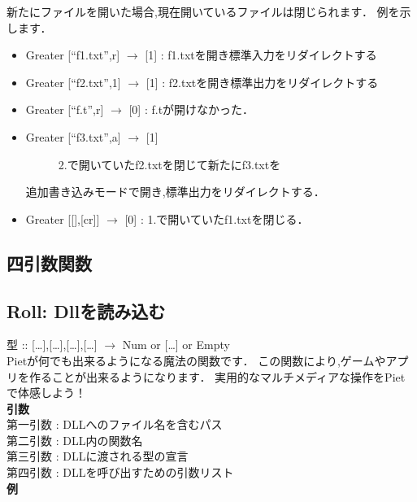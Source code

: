 新たにファイルを開いた場合,現在開いているファイルは閉じられます．
例を示します．

\begin{itemize}
\item
  Greater {[}``f1.txt'',r{]} $\to$ {[}1{]} :
  f1.txtを開き標準入力をリダイレクトする
\item
  Greater {[}``f2.txt'',1{]} $\to$ {[}1{]} :
  f2.txtを開き標準出力をリダイレクトする
\item
  Greater {[}``f.t'',r{]} $\to$ {[}0{]} : f.tが開けなかった．
\item
  \begin{description}
  \item[Greater {[}``f3.txt'',a{]} $\to$ {[}1{]}]
  2.で開いていたf2.txtを閉じて新たにf3.txtを
  \end{description}

  追加書き込みモードで開き,標準出力をリダイレクトする．
\item
  Greater {[}{[}{]},{[}cr{]}{]} $\to$ {[}0{]} :
  1.で開いていたf1.txtを閉じる．
\end{itemize}

\subsection{四引数関数}

\subsection{Roll: Dllを読み込む}

型 :: {[}\ldots{}{]},{[}\ldots{}{]},{[}\ldots{}{]},{[}\ldots{}{]}
$\to$ Num or {[}\ldots{}{]} or
Empty\\Pietが何でも出来るようになる魔法の関数です．
この関数により,ゲームやアプリを作ることが出来るようになります．
実用的なマルチメディアな操作をPietで体感しよう！\\\textbf{引数}\\第一引数
: DLLへのファイル名を含むパス\\第二引数 : DLL内の関数名\\第三引数 :
DLLに渡される型の宣言\\第四引数 :
DLLを呼び出すための引数リスト\\\textbf{例}

